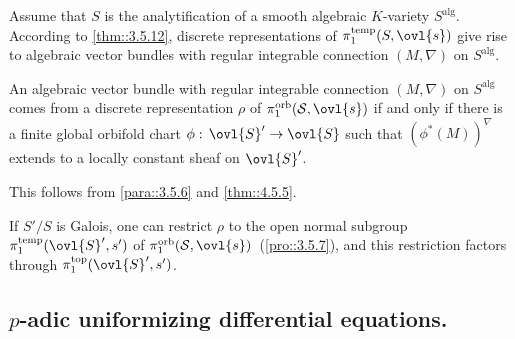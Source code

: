 \begin{para}\label{para::4.5.8} Assume that $S$ is the analytification of a
 smooth algebraic $K$-variety $S^{\mathrm{alg}}$. According to
 \ref{thm::3.5.12}, 
 discrete representations of $\pi_1^{\mathrm{temp}}(S,\ovl{s})$ give rise
 to algebraic vector bundles with regular integrable 
 connection $(M,\nabla)$ on $S^{\mathrm{alg}}$. 
\end{para}

\begin{pro}\label{pro::4.5.9} An algebraic vector bundle with regular integrable
connection $(M,\nabla)$ on $S^{\mathrm{alg}}$ comes from a discrete representation $\rho$ of $\pi_1^{\mathrm{orb}}(\mathcal{S},\ovl{s})$ if and
only if there is a finite global orbifold chart $\phi:\,\ovl{S}'\to \ovl{S}$ such that $(\phi^\ast(M))^\nabla$ extends to a
locally constant sheaf on $\ovl{S}'$.   
\end{pro}

This follows from \ref{para::3.5.6} and \ref{thm::4.5.5}. 

\medskip{} If $S'/S$ is Galois, one can restrict
$\rho$ to the open normal subgroup $ 
\pi_1^{\mathrm{temp}}(\ovl{S}',s')$ of
$\pi_1^{\mathrm{orb}}(\mathcal{S},\ovl{s})\,$ (\ref{pro::3.5.7}), and this restriction
factors through $\pi_1^{\mathrm{top}}(\ovl{S}',s')$.

 
 
\subsection{$p$-adic uniformizing differential equations.}\label{sub::4.6}

